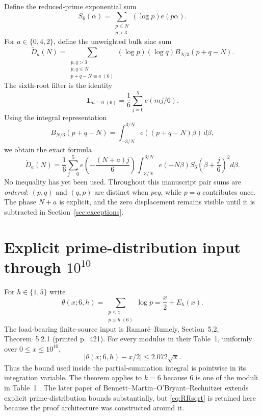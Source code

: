 \documentclass[11pt]{article}
\theoremstyle{definition}
\newcommand{\RR}{Ramar\'{e}--Rumely}
\newcommand{\abs}[1]{\left|#1\right|}
\begin{document}
Define the reduced-prime exponential sum
\begin{equation}\label{eq:S6}
S_6(\alpha)=
\sum_{\substack{p\le N\\p>3}}
(\log p)e(p\alpha).
\end{equation}
For $a\in\{0,4,2\}$, define the unweighted bulk sinc sum
\begin{equation}\label{eq:Dtilde}
\widetilde D_a(N)
=
\sum_{\substack{p,q>3\\p,q\le N\\p+q-N\equiv a\;(6)}}
(\log p)(\log q)B_{N/3}(p+q-N).
\end{equation}
The sixth-root filter is the identity
\[
\mathbf1_{m\equiv0\;(6)}
=\frac16\sum_{j=0}^5 e(mj/6).
\]
Using the integral representation
\[
B_{N/3}(p+q-N)
=
\int_{-3/N}^{3/N}e((p+q-N)\beta)\,d\beta,
\]
we obtain the exact formula
\begin{equation}\label{eq:root-filter}
\boxed{
\widetilde D_a(N)
=
\frac16\sum_{j=0}^{5}
 e\!\left(-\frac{(N+a)j}{6}\right)
\int_{-3/N}^{3/N}
 e(-N\beta)
 S_6\!\left(\beta+\frac j6\right)^2d\beta.
}
\end{equation}
No inequality has yet been used. Throughout this manuscript pair sums are \emph{ordered}: $(p,q)$ and $(q,p)$ are distinct when $p
e q$, while $p=q$ contributes once. The phase $N+a$ is explicit, and the zero displacement remains visible until it is subtracted in Section~\ref{sec:exceptions}.

\section{Explicit prime-distribution input through $10^{10}$}\label{sec:finiteanalytic}

For $h\in\{1,5\}$ write
\[
\theta(x;6,h)=\sum_{\substack{p\le x\\p\equiv h\;(6)}}\log p
=\frac{x}{2}+E_h(x).
\]
The load-bearing finite-source input is \RR, Section~5.2, Theorem~5.2.1 (printed p.~421). For every modulus in their Table~1, uniformly over $0\le x\le10^{10}$,
\begin{equation}\label{eq:RRsqrt}
\boxed{\abs{\theta(x;6,h)-x/2}\le2.072\sqrt{x}.}
\end{equation}
Thus the bound used inside the partial-summation integral is pointwise in its integration variable. The theorem applies to $k=6$ because $6$ is one of the moduli in Table~1 \cite{RamareRumely1996}. The later paper of Bennett--Martin--O'Bryant--Rechnitzer extends explicit prime-distribution bounds substantially, but \eqref{eq:RRsqrt} is retained here because the proof architecture was constructed around it.
\end{document}
